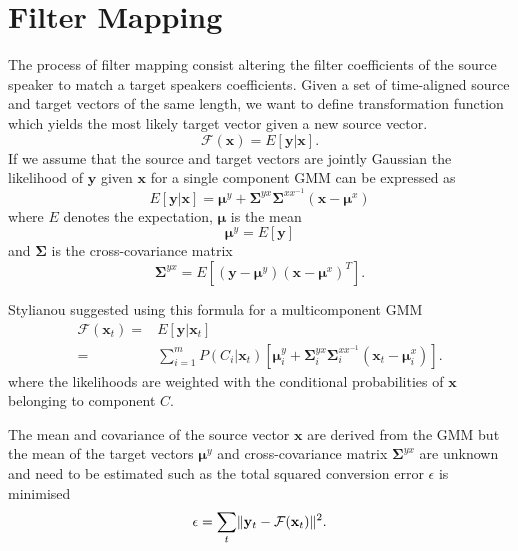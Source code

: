 \section{Filter Mapping} %
\label{sec:conversion_function}
The process of filter mapping consist altering the filter coefficients of the source speaker to match a target speakers coefficients. Given a set of time-aligned source and target vectors of the same length, we want to define transformation function which yields the most likely target vector given a new source vector.
\begin{equation}
	\mathcal{F}(\mathbf{x}) = E[\mathbf{y}\vert \mathbf{x}].
\end{equation}
If we assume that the source and target vectors are jointly Gaussian the likelihood of $\mathbf{y}$ given $\mathbf{x}$ for a single component GMM can be expressed as \cite{kay93}
\begin{equation}
	E[\mathbf{y}\vert \mathbf{x}] = \boldsymbol{\mu}^y + \mathbf{\Sigma}^{yx} \mathbf{\Sigma}^{xx^{-1}} (\mathbf{x}-\boldsymbol{\mu}^x)
\end{equation}
where $E$ denotes the expectation, $\boldsymbol{\mu}$ is the mean
\begin{equation}
	\boldsymbol{\mu}^y = E[\mathbf{y}]
\end{equation}
and $\mathbf{\Sigma}$ is the cross-covariance matrix
\begin{equation}
	\mathbf{\Sigma}^{yx} = E[(\mathbf{y}-\boldsymbol{\mu}^y)(\mathbf{x}-\boldsymbol{\mu}^x)^T].
\end{equation}

Stylianou \etal \cite{stylianou95} suggested using this formula for a multicomponent GMM
\begin{equation}
	\label{eq:conversion_function}
	\begin{split}
		\mathcal{F}(\mathbf{x}_t) =& E[\mathbf{y}\vert \mathbf{x}_t]\\
		=& \sum_{i=1}^{m}P(C_i \vert \mathbf{x}_t)[\boldsymbol{\mu}_i^y + \mathbf{\Sigma}_i^{yx} \mathbf{\Sigma}_i^{xx^{-1}} (\mathbf{x}_t-\boldsymbol{\mu}_i^x)].
	\end{split}
\end{equation}
where the likelihoods are weighted with the conditional probabilities of $\mathbf{x}$ belonging to component $C$.

The mean and covariance of the source vector $\mathbf{x}$ are derived from the GMM but the mean of the target vectors $\boldsymbol{\mu}^y$ and cross-covariance matrix $\mathbf{\Sigma}^{yx}$ are unknown and need to be estimated such as the total squared conversion error $\epsilon$ is minimised
\begin{equation}
	\label{eq:conversion_error}
	\epsilon = \sum_{t} \lVert\mathbf{y}_t - \mathcal{F}(\mathbf{x}_t)\rVert^2.
\end{equation}

